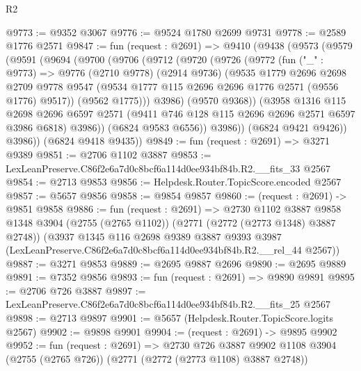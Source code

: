 \begin{lexlean}{R2}
\begin{coremodule}
@9773 := @9352 @3067
@9776 := @9524 @1780 @2699 @9731
@9778 := @2589 @1776 @2571
@9847 := fun (request : @2691) =>
  @9410
    (@9438
      (@9573
        (@9579
          (@9591
            (@9694
              (@9700
                (@9706
                  (@9712
                    (@9720
                      (@9726
                        (@9772
                          (fun ("_" : @9773) =>
                          @9776
                            (@2710 @9778)
                            (@2914 @9736)
                            (@9535
                              @1779
                              @2696
                              @2698
                              @2709
                              @9778
                              @9547
                              (@9534 @1777 @115 @2696 @2696 @1776 @2571 (@9556 @1776) @9517))
                            (@9562 @1775)))
                        @3986)
                      (@9570 @9368))
                    (@3958
                      @1316
                      @115
                      @2698
                      @2696
                      @6597
                      @2571
                      (@9411 @746 @128 @115 @2696 @2696 @2571 @6597 @3986 @6818)
                      @3986))
                  (@6824 @9583 @6556))
                @3986))
            (@6824 @9421 @9426))
          @3986))
      (@6824 @9418 @9435))
@9849 := fun (request : @2691) => @3271 @9389
@9851 := @2706 @1102 @3887
@9853 := LexLeanPreserve.C86f2e6a7d0c8bcf6a114d0ee934bf84b.R2.__fits_33 @2567
@9854 := @2713 @9853
@9856 := Helpdesk.Router.TopicScore.encoded @2567
@9857 := @5657 @9856
@9858 := @9854 @9857
@9860 := (request : @2691) -> @9851 @9858
@9886 := fun (request : @2691) =>
  @2730
    @1102
    @3887
    @9858
    @1348
    @3904
    (@2755 (@2765 @1102))
    (@2771 (@2772 (@2773 @1348) @3887 @2748))
    (@3937
      @1345
      @116
      @2698
      @9389
      @3887
      @9393
      @3987
      (LexLeanPreserve.C86f2e6a7d0c8bcf6a114d0ee934bf84b.R2.__rel_44 @2567))
@9887 := @3271 @9853
@9889 := @2695 @9887 @2696
@9890 := @2695 @9889
@9891 := @7352 @9856
@9893 := fun (request : @2691) => @9890 @9891
@9895 := @2706 @726 @3887
@9897 := LexLeanPreserve.C86f2e6a7d0c8bcf6a114d0ee934bf84b.R2.__fits_25 @2567
@9898 := @2713 @9897
@9901 := @5657 (Helpdesk.Router.TopicScore.logits @2567)
@9902 := @9898 @9901
@9904 := (request : @2691) -> @9895 @9902
@9952 := fun (request : @2691) =>
  @2730
    @726
    @3887
    @9902
    @1108
    @3904
    (@2755 (@2765 @726))
    (@2771 (@2772 (@2773 @1108) @3887 @2748))

\end{coremodule}
\end{lexlean}
